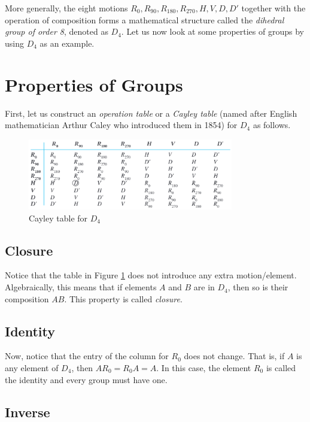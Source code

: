 More generally, the eight motions \(R_0, R_{90}, R_{180}, R_{270}, H, V, D, D'\) together with the operation of composition forms a mathematical structure called the \textit{dihedral group of order 8}, denoted as \(D_4\). Let us now look at some properties of groups by using \(D_4\) as an example.

\section{Properties of Groups}

First, let us construct an \textit{operation table} or a \textit{Cayley table} (named after English mathematician Arthur Caley who introduced them in 1854) for \(D_4\) as follows.

\begin{figure}[ht]
    \centering
    \includegraphics[width=0.8\textwidth]{images/ch1-cayley-table.png}
    \caption{Cayley table for \(D_4\)}
    \label{fig:cayleytable}
\end{figure}

\subsection{Closure}

Notice that the table in Figure \ref{fig:cayleytable} does not introduce any extra motion/element. Algebraically, this means that if elements \(A\) and \(B\) are in \(D_4\), then so is their composition \(AB\). This property is called \textit{closure}.

\subsection{Identity}

Now, notice that the entry of the column for \(R_0\) does not change. That is, if \(A\) is any element of \(D_4\), then \(AR_0 = R_0 A = A\). In this case, the element \(R_0\) is called the identity and every group must have one.

\subsection{Inverse}

